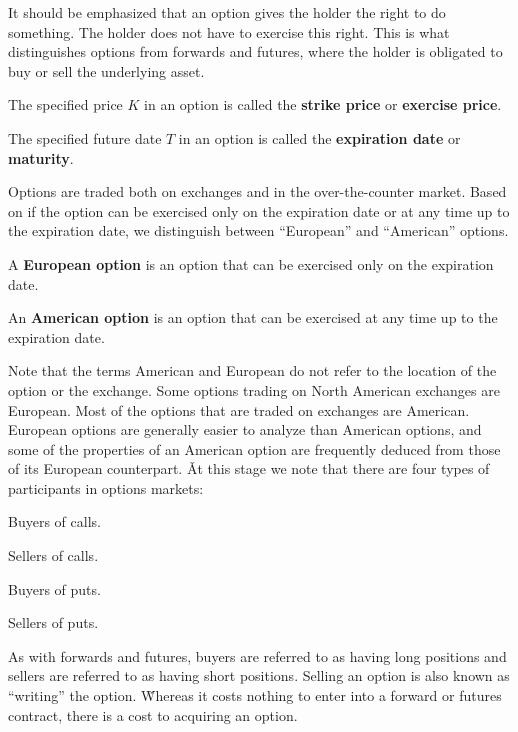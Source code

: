 It should be emphasized that an option gives the holder the right to do something. The holder does not have to
exercise this right. This is what distinguishes options from forwards and futures, where the holder is obligated to
buy or sell the underlying asset.

The specified price $K$ in an option is called the \textbf{strike price} or \textbf{exercise price}.
\ed

The specified future date $T$ in an option is called the \textbf{expiration date} or \textbf{maturity}.
\ed

Options are traded both on exchanges and in the over-the-counter market. Based on if the option can be exercised only
on the expiration date or at any time up to the expiration date, we distinguish between ``European'' and ``American''
options.

A \textbf{European option} is an option that can be exercised only on the expiration date.
\ed

An \textbf{American option} is an option that can be exercised at any time up to the expiration date.
\ed

Note that the terms American and European do not refer to the location of the option or the exchange. Some options
trading on North American exchanges are European. Most of the options that are traded on exchanges are American.
European options are generally easier to analyze than American options, and some of the properties of an American
option are frequently deduced from those of its European counterpart. \v

At this stage we note that there are four types of participants in options markets:
\bit
\item Buyers of calls.
\item Sellers of calls.
\item Buyers of puts.
\item Sellers of puts.
\eit

As with forwards and futures, buyers are referred to as having long positions and sellers are referred to as having
short positions. Selling an option is also known as ``writing'' the option. \v

Whereas it costs nothing to enter into a forward or futures contract, there is a cost to acquiring an option.